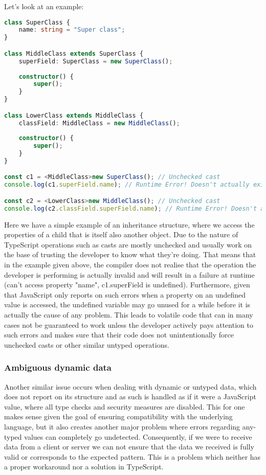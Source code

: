 Let's look at an example:

\begin{lstlisting}[language=TypeScript]
class SuperClass {
	name: string = "Super class";
}

class MiddleClass extends SuperClass {
	superField: SuperClass = new SuperClass();
	
	constructor() {
		super();
	}
}

class LowerClass extends MiddleClass {
	classField: MiddleClass = new MiddleClass();
	
	constructor() {
		super();
	}
}

const c1 = <MiddleClass>new SuperClass(); // Unchecked cast
console.log(c1.superField.name); // Runtime Error! Doesn't actually exist

const c2 = <LowerClass>new MiddleClass(); // Unchecked cast
console.log(c2.classField.superField.name); // Runtime Error! Doesn't actually exist
\end{lstlisting}

Here we have a simple example of an inheritance structure, where we access the properties of a child that is itself also another object. Due to the nature of TypeScript operations such as casts are mostly unchecked and usually work on the base of trusting the developer to know what they're doing. That means that in the example given above, the compiler does not realise that the operation the developer is performing is actually invalid and will result in a failure at runtime (can't access property "name", c1.superField is undefined). Furthermore, given that JavaScript only reports on such errors when a property on an undefined value is accessed, the undefined variable may go unused for a while before it is actually the cause of any problem. This leads to volatile code that can in many cases not be guaranteed to work unless the developer actively pays attention to such errors and makes sure that their code does not unintentionally force unchecked casts or other similar untyped operations.

\subsubsection{Ambiguous dynamic data}

Another similar issue occurs when dealing with dynamic or untyped data, which does not report on its structure and as such is handled as if it were a JavaScript value, where all type checks and security measures are disabled. This for one makes sense given the goal of ensuring compatibility with the underlying language, but it also creates another major problem where errors regarding any-typed values can completely go undetected. Consequently, if we were to receive data from a client or server we can not ensure that the data we received is fully valid or corresponds to the expected pattern. This is a problem which neither has a proper workaround nor a solution in TypeScript. 

